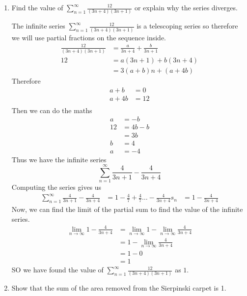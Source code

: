 \documentclass{article}
\begin{document}
\begin{enumerate}[label=\textbf{(10.\arabic*)}]
\newpage

\item Find the value of $\displaystyle \sum_{n=1}^\infty \frac{12}{(3n+4)(3n+1)}$ or explain why the series diverges. 

The infinite series $\displaystyle \sum_{n=1}^\infty \frac{12}{(3n+4)(3n+1)}$ is a telescoping series so therefore we will use partial fractions on the sequence inside.
\begin{align*}
\frac{12}{(3n+4)(3n+1)} &= \frac{a}{3n+4} + \frac{b}{3n+1}\\
12 &= a(3n+1)+b(3n+4)\\
&= 3(a+b)n+(a+4b)
\end{align*}
Therefore
\begin{align*}
a+b&=0\\
a+4b&=12\\
\end{align*}
Then we can do the maths
\begin{align*}
a &= -b\\
12 &= 4b-b\\
&= 3b\\
b&= 4\\
a &= -4
\end{align*}
Thus we have the infinite series
\[\sum_{n=1}^\infty\frac{4}{3n+1}-\frac{4}{3n+4}\]
Computing the series gives us
\begin{align*}
\sum_{n=1}^\infty\frac{4}{3n+1}-\frac{4}{3n+4} &= 1-\frac{4}{7}+\frac{4}{7}\ldots-\frac{4}{3n+4}
s_n &= 1-\frac{4}{3n+4}
\end{align*}
Now, we can find the limit of the partial sum to find the value of the infinite series.
\begin{align*}
\lim_{n\to\infty} 1-\frac{4}{3n+4} &= \lim_{n\to\infty}1-\lim_{n\to\infty}\frac{4}{3n+4}\\
&= 1-\lim_{n\to\infty}\frac{4}{3n+4}\\
&= 1-0\\
&= 1
\end{align*}
SO we have found the value of $\displaystyle \sum_{n=1}^\infty \frac{12}{(3n+4)(3n+1)}$ as $1$.

\newpage

\item Show that the sum of the area removed from the Sierpinski carpet is 1.


\end{enumerate}
\end{document}
